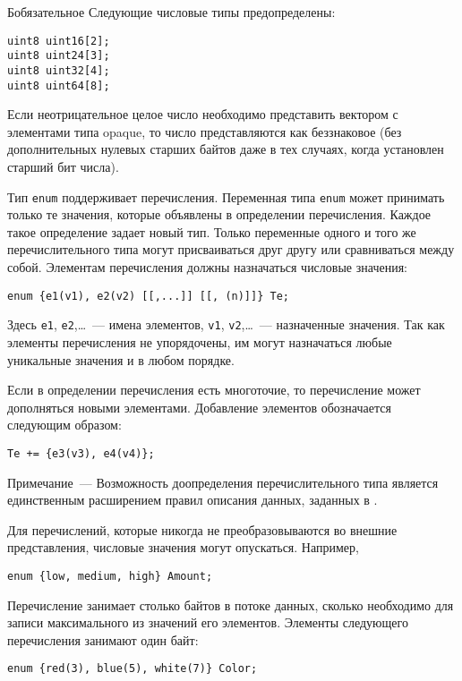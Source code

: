 \begin{appendix}{Б}{обязательное}
Следующие числовые типы предопределены:
\begin{lstlisting}
uint8 uint16[2];
uint8 uint24[3];
uint8 uint32[4];
uint8 uint64[8];
\end{lstlisting}

Если неотрицательное целое число необходимо представить вектором с 
элементами типа opaque, то число представляются как беззнаковое (без 
дополнительных нулевых старших байтов даже в тех случаях, когда установлен 
старший бит числа). 

\label{SYNTAX.5}

Тип \lstinline{enum} поддерживает перечисления. Переменная типа \lstinline{enum} 
может принимать только те значения, которые объявлены в определении 
перечисления. Каждое такое определение задает новый тип. Только переменные 
одного и того же перечислительного типа могут присваиваться друг другу или 
сравниваться между собой. Элементам перечисления должны назначаться числовые 
значения:
\begin{lstlisting}
enum {e1(v1), e2(v2) [[,...]] [[, (n)]]} Te;
\end{lstlisting}

Здесь \lstinline{e1}, \lstinline{e2},\ldots~--- имена элементов, 
\lstinline{v1}, \lstinline{v2},\ldots~--- назначенные значения. Так как 
элементы перечисления не упорядочены, им могут назначаться любые 
уникальные значения и в любом порядке. 

Если в определении перечисления есть многоточие, то перечисление может 
дополняться новыми элементами. Добавление элементов обозначается 
следующим образом: 
\begin{lstlisting}
Te += {e3(v3), e4(v4)};
\end{lstlisting}

\begin{note}
Примечание~--- Возможность доопределения перечислительного типа является 
единственным расширением правил описания данных, заданных в \cite{RFC5246}. 
\end{note}

Для перечислений, которые никогда не преобразовываются во внешние 
представления, числовые значения могут опускаться. Например, 
\begin{lstlisting}
enum {low, medium, high} Amount;
\end{lstlisting}

Перечисление занимает столько байтов в потоке данных, сколько необходимо 
для записи максимального из значений его элементов. Элементы следующего 
перечисления занимают один байт:  
\begin{lstlisting}
enum {red(3), blue(5), white(7)} Color;
\end{lstlisting}


\end{appendix}
